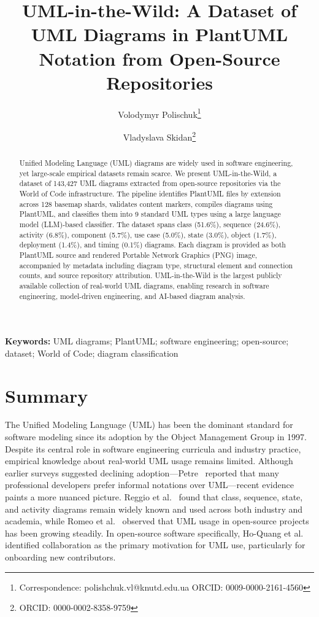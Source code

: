 \documentclass[11pt]{article}
\title{UML-in-the-Wild: A Dataset of UML Diagrams in PlantUML Notation from Open-Source Repositories}
\author[1]{Volodymyr Polischuk\thanks{Correspondence: polishchuk.vl@knutd.edu.ua \quad ORCID: 0009-0000-2161-4560}}
\author[1]{Vladyslava Skidan\thanks{ORCID: 0000-0002-8358-9759}}
\affil[1]{Kyiv National University of Technologies and Design, 01011 Kyiv, Ukraine}
\date{}
\begin{document}
\maketitle

\begin{abstract}
\noindent Unified Modeling Language (UML) diagrams are widely used in software engineering, yet large-scale empirical datasets remain scarce. We present UML-in-the-Wild, a dataset of 143,427 UML diagrams extracted from open-source repositories via the World of Code infrastructure. The pipeline identifies PlantUML files by extension across 128 basemap shards, validates content markers, compiles diagrams using PlantUML, and classifies them into 9 standard UML types using a large language model (LLM)-based classifier. The dataset spans class (51.6\%), sequence (24.6\%), activity (6.8\%), component (5.7\%), use case (5.0\%), state (3.0\%), object (1.7\%), deployment (1.4\%), and timing (0.1\%) diagrams. Each diagram is provided as both PlantUML source and rendered Portable Network Graphics (PNG) image, accompanied by metadata including diagram type, structural element and connection counts, and source repository attribution. UML-in-the-Wild is the largest publicly available collection of real-world UML diagrams, enabling research in software engineering, model-driven engineering, and AI-based diagram analysis.
\end{abstract}

\noindent\textbf{Keywords:} UML diagrams; PlantUML; software engineering; open-source; dataset; World of Code; diagram classification

\vspace{1em}

\section{Summary}
\label{sec:summary}

The Unified Modeling Language (UML) has been the dominant standard for software modeling since its adoption by the Object Management Group in 1997. Despite its central role in software engineering curricula and industry practice, empirical knowledge about real-world UML usage remains limited. Although earlier surveys suggested declining adoption---Petre~\cite{petre2013uml} reported that many professional developers prefer informal notations over UML---recent evidence paints a more nuanced picture. Reggio et al.~\cite{reggio2014who} found that class, sequence, state, and activity diagrams remain widely known and used across both industry and academia, while Romeo et al.~\cite{romeo2025uml} observed that UML usage in open-source projects has been growing steadily. In open-source software specifically, Ho-Quang et al.~\cite{hoquang2017practices} identified collaboration as the primary motivation for UML use, particularly for onboarding new contributors.
\end{document}
